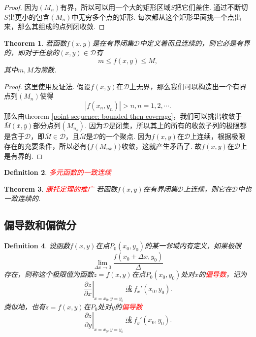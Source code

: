 \documentclass{article}
\newtheorem{theorem}{Theorem}[section]
\newtheorem{definition}[theorem]{Definition}
\newcommand{\redt}[1]{\textcolor{red}{#1}}
\begin{document}
\begin{proof}
因为$(M_n)$有界，所以可以用一个大的矩形区域$S$把它们盖住. 通过不断切$S$出更小的包含$(M_n)$中无穷多个点的矩形. 每次都从这个矩形里面挑一个点出来，那么其组成的点列闭收敛. 
\end{proof}

\begin{theorem}
\rm  若函数$f(x,y)$是在有界闭集$\mathcal{D}$中定义着而且连续的，则它必是有界的，即对于任意的$(x,y) \in \mathcal{D}$有
$$
m \leq f(x,y) \leq M,
$$
其中$m,M$为常数.
\end{theorem}

\begin{proof}
\rm 这里使用反证法. 假设$f(x,y)$在$\mathcal{D}$上无界，那么我们可以构造出一个有界点列$(M_n)$使得
$$
|f(x_n,y_n)| > n , n =1,2,\cdots.
$$
那么由theorem \ref{point-sequence: bounded-then-coverage}，我们可以挑出收敛于$\bar{M}(\bar{x},\bar{y})$部分点列$(M_{n_k})$. 因为$\mathcal{D}$是闭集，所以其上的所有的收敛子列的极限都是含于$\mathcal{D}$，即$\bar{M} \in \mathcal{D}$，且$\bar{M}$是$\mathcal{D}$的一个聚点. 因为$f(x,y)$在$\mathcal{D}$上连续，根据极限存在的充要条件，所以必有$\{f(M_{nk})\}$收敛，这就产生矛盾了. 故$f(x,y)$在$\mathcal{D}$上是有界的. 
\end{proof}

\begin{definition}
\rm \redt{多元函数的一致连续} 
\end{definition}

\begin{theorem}
\rm \redt{康托定理的推广} 若函数$f(x,y)$在有界闭集$\mathcal{D}$上连续，则它在$\mathcal{D}$中也一致连续的. 
\end{theorem}

\newpage
\subsection{偏导数和偏微分}

\begin{definition}
\rm 设函数$f(x,y)$在点$P_0(x_0,y_0)$的某一邻域内有定义，如果极限
$$
\lim\limits_{\Delta x \to 0} \frac{f(x_0 + \Delta x,y_0)}{\Delta}
$$
存在，则称这个极限值为函数$z = f(x,y)$在点$P_0(x_0,y_0)$处对$x$的\redt{偏导数}，记为
$$
\left.\frac{\partial z}{\partial x}\right|_{x=x_0,y=y_0} ~\text{或}~ f_x'(x_0,y_0).
$$
类似地，也有$z=f(x,y)$在$P_0$处对$y$的\redt{偏导数}
$$
\left.\frac{\partial z}{\partial y}\right|_{x=x_0,y=y_0} ~\text{或}~ f_y'(x_0,y_0).
$$
\end{definition}
\end{document}
